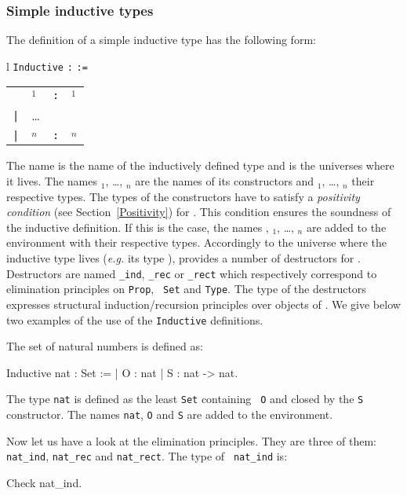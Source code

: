 \subsubsection{Simple inductive types}

The definition of a simple inductive type has the following form:

\medskip
\begin{tabular}{l}
{\tt Inductive} {\ident} {\tt :} {\sort} {\tt :=} \\
\begin{tabular}{clcl}
         & {\ident$_1$} & {\tt :} & {\type$_1$} \\
 {\tt |} & {\ldots} && \\
 {\tt |} & {\ident$_n$} & {\tt :} & {\type$_n$} \\
\end{tabular}
\end{tabular}
\medskip

The name {\ident} is the name of the inductively defined type and
{\sort} is the universes where it lives.
The names {\ident$_1$}, {\ldots}, {\ident$_n$}
are the names of its constructors and {\type$_1$}, {\ldots},
{\type$_n$} their respective types. The types of the constructors have
to satisfy a {\em positivity condition} (see Section~\ref{Positivity})
for {\ident}.  This condition ensures the soundness of the inductive
definition.  If this is the case, the names {\ident},
{\ident$_1$}, {\ldots}, {\ident$_n$} are added to the environment with
their respective types.  Accordingly to the universe where
the inductive type lives ({\it e.g.} its type {\sort}), {\Coq} provides a
number of destructors for {\ident}.  Destructors are named
{\ident}{\tt\_ind}, {\ident}{\tt \_rec} or {\ident}{\tt \_rect} which
respectively correspond to elimination principles on {\tt Prop}, {\tt
Set} and {\tt Type}.  The type of the destructors expresses structural
induction/recursion principles over objects of {\ident}. We give below
two examples of the use of the {\tt Inductive} definitions.

The set of natural numbers is defined as:
\begin{coq_example}
Inductive nat : Set :=
  | O : nat
  | S : nat -> nat.
\end{coq_example}

The type {\tt nat} is defined as the least \verb:Set: containing {\tt
  O} and closed by the {\tt S} constructor. The names {\tt nat},
{\tt O} and {\tt S} are added to the environment.

Now let us have a look at the elimination principles. They are three
of them:
{\tt nat\_ind}, {\tt nat\_rec} and {\tt nat\_rect}.  The type of {\tt
  nat\_ind} is:
\begin{coq_example}
Check nat_ind.
\end{coq_example}


